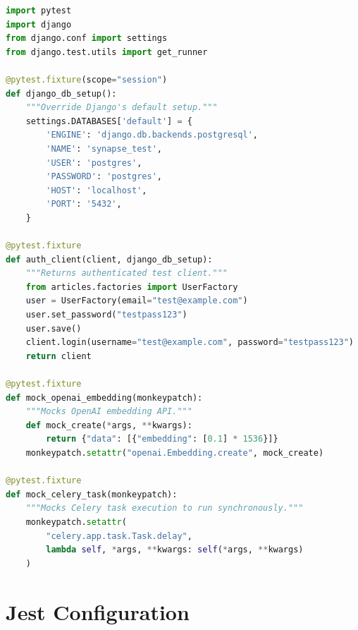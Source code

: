 \documentclass{report}
\begin{document}
\begin{lstlisting}[language=Python, caption=Comprehensive conftest.py with reusable fixtures]
import pytest
import django
from django.conf import settings
from django.test.utils import get_runner

@pytest.fixture(scope="session")
def django_db_setup():
    """Override Django's default setup."""
    settings.DATABASES['default'] = {
        'ENGINE': 'django.db.backends.postgresql',
        'NAME': 'synapse_test',
        'USER': 'postgres',
        'PASSWORD': 'postgres',
        'HOST': 'localhost',
        'PORT': '5432',
    }

@pytest.fixture
def auth_client(client, django_db_setup):
    """Returns authenticated test client."""
    from articles.factories import UserFactory
    user = UserFactory(email="test@example.com")
    user.set_password("testpass123")
    user.save()
    client.login(username="test@example.com", password="testpass123")
    return client

@pytest.fixture
def mock_openai_embedding(monkeypatch):
    """Mocks OpenAI embedding API."""
    def mock_create(*args, **kwargs):
        return {"data": [{"embedding": [0.1] * 1536}]}
    monkeypatch.setattr("openai.Embedding.create", mock_create)

@pytest.fixture
def mock_celery_task(monkeypatch):
    """Mocks Celery task execution to run synchronously."""
    monkeypatch.setattr(
        "celery.app.task.Task.delay",
        lambda self, *args, **kwargs: self(*args, **kwargs)
    )
\end{lstlisting}

\section{Jest Configuration}
\end{document}
